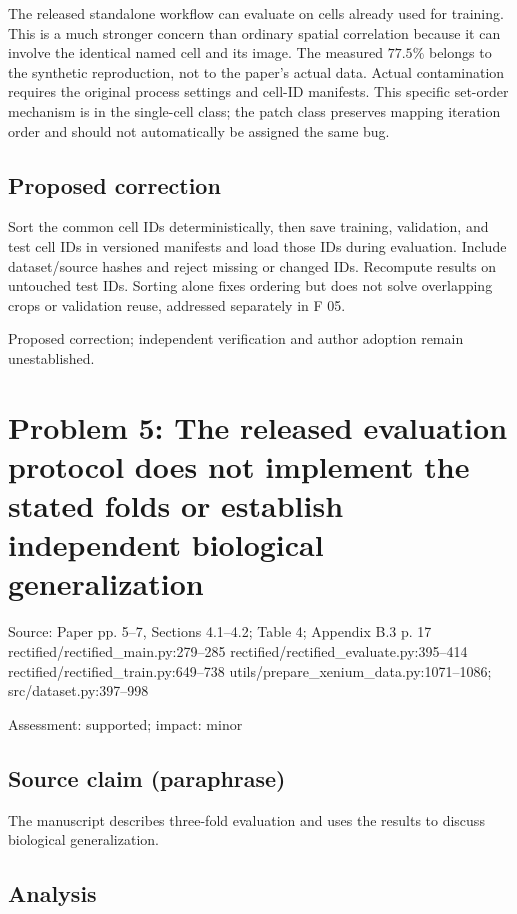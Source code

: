 \documentclass[11pt]{article}
\begin{document}
The released standalone workflow can evaluate on cells already used for training. This is a much stronger concern than ordinary spatial correlation because it can involve the identical named cell and its image. The measured \(77.5\%\) belongs to the synthetic reproduction, not to the paper's actual data. Actual contamination requires the original process settings and cell-ID manifests. This specific set-order mechanism is in the single-cell class; the patch class preserves mapping iteration order and should not automatically be assigned the same bug.

\subsection*{Proposed correction}

Sort the common cell IDs deterministically, then save training, validation, and test cell IDs in versioned manifests and load those IDs during evaluation. Include dataset/source hashes and reject missing or changed IDs. Recompute results on untouched test IDs. Sorting alone fixes ordering but does not solve overlapping crops or validation reuse, addressed separately in F 05.

Proposed correction; independent verification and author adoption remain unestablished.

\section*{Problem 5: The released evaluation protocol does not implement the stated folds or establish independent biological generalization}

Source: Paper pp. 5–7, Sections 4.1–4.2; Table 4; Appendix B.3 p. 17 rectified/rectified\_main.py:279–285 rectified/rectified\_evaluate.py:395–414 rectified/rectified\_train.py:649–738 utils/prepare\_xenium\_data.py:1071–1086; src/dataset.py:397–998

Assessment: supported; impact: minor

\subsection*{Source claim (paraphrase)}

The manuscript describes three-fold evaluation and uses the results to discuss biological generalization.

\subsection*{Analysis}
\end{document}
